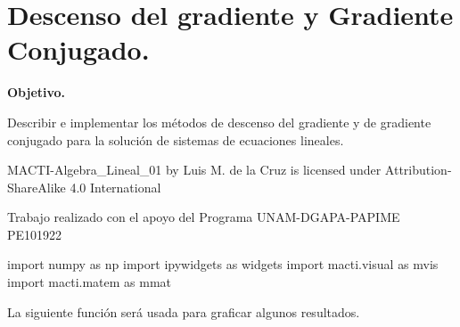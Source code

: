 \documentclass[
  letterpaper,
  DIV=11,
  numbers=noendperiod]{scrreprt}
\newenvironment{Shaded}{\begin{snugshade}}{\end{snugshade}}
\newcommand{\ImportTok}[1]{\textcolor[rgb]{0.00,0.46,0.62}{#1}}
\newcommand{\NormalTok}[1]{\textcolor[rgb]{0.00,0.23,0.31}{#1}}
\begin{document}

\chapter{Descenso del gradiente y Gradiente
Conjugado.}\label{descenso-del-gradiente-y-gradiente-conjugado.}

\textbf{Objetivo.}

Describir e implementar los métodos de descenso del gradiente y de
gradiente conjugado para la solución de sistemas de ecuaciones lineales.

MACTI-Algebra\_Lineal\_01 by Luis M. de la Cruz is licensed under
Attribution-ShareAlike 4.0 International

Trabajo realizado con el apoyo del Programa UNAM-DGAPA-PAPIME PE101922

\begin{Shaded}
\begin{Highlighting}[]
\ImportTok{import}\NormalTok{ numpy }\ImportTok{as}\NormalTok{ np}
\ImportTok{import}\NormalTok{ ipywidgets }\ImportTok{as}\NormalTok{ widgets}
\ImportTok{import}\NormalTok{ macti.visual }\ImportTok{as}\NormalTok{ mvis}
\ImportTok{import}\NormalTok{ macti.matem }\ImportTok{as}\NormalTok{ mmat}
\end{Highlighting}
\end{Shaded}

La siguiente función será usada para graficar algunos resultados.
\end{document}
